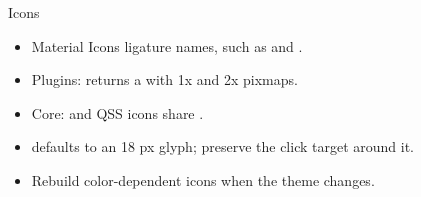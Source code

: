 \begin{standardframe}{Icons}
\begin{itemize}
\item Material Icons ligature names, such as  and .
\item Plugins:  returns a  with 1x and 2x pixmaps.
\item Core:  and QSS icons share .
\item {} defaults to an 18 px glyph; preserve the click target around it.
\item Rebuild color-dependent icons when the theme changes.
\end{itemize}
\end{standardframe}
